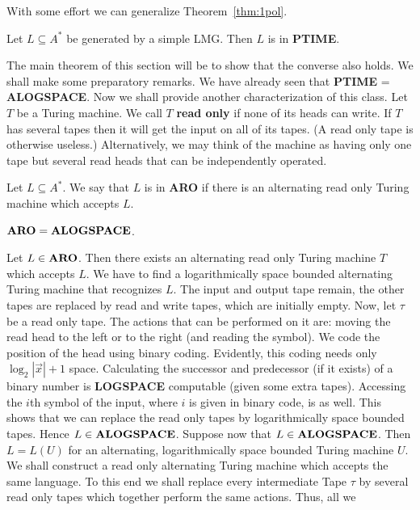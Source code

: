 With some effort we can generalize Theorem~\ref{thm:1pol}.
\begin{thm}
\label{thm:npol}
Let $L \subseteq A^{\ast}$ be generated by a simple LMG.
Then $L$ is in \textbf{PTIME}.
\end{thm}
The main theorem of this section will be to show that the
converse also holds. We shall make some preparatory remarks.
We have already seen that {\bf PTIME} = {\bf ALOGSPACE}. Now 
we shall provide another characterization of this class. Let $T$ 
be a Turing machine. We call $T$ {\bf read only} if none of 
its heads can write. If 
$T$ has several tapes then it will get the input on all of its 
tapes. (A read only tape is otherwise useless.) Alternatively, 
we may think of the machine as having only one tape but several read
heads that can be independently operated.
\begin{defn}
Let $L \subseteq A^{\ast}$. We say that $L$ is in \textbf{ARO}
if there is an alternating read only Turing machine
which accepts $L$.
\end{defn}
\begin{thm}
$\mbox{\textbf{ARO}} = \mbox{\textbf{ALOGSPACE}}$.
\end{thm}
\proofbeg
Let $L \in \mbox{\bf ARO}$. Then there exists an alternating read
only Turing machine $T$ which accepts $L$. We have to find a
logarithmically space bounded alternating Turing machine that
recognizes $L$. The input and output tape remain, the other
tapes are replaced by read and write tapes, which are initially
empty. Now, let $\tau$ be a read only tape. The actions that
can be performed on it are: moving the read head to the left
or to the right (and reading the symbol). We code the position
of the head using binary coding. Evidently, this coding needs only
$\log_2 |\vec{x}| + 1$ space. Calculating the successor and
predecessor (if it exists) of a binary number is {\bf LOGSPACE}
computable (given some extra tapes). Accessing the $i$th symbol
of the input, where $i$ is given in binary code, is as well.
This shows that we can replace the read only tapes by 
logarithmically space bounded tapes. Hence $L \in 
\mbox{\bf ALOGSPACE}$. Suppose now that $L \in \mbox{\bf ALOGSPACE}$. 
Then $L = L(U)$ for an alternating, logarithmically space bounded 
Turing machine $U$. We shall construct a read only alternating 
Turing machine which accepts the same language. To this end we 
shall replace every intermediate Tape $\tau$ by several read 
only tapes which together perform the same actions. Thus, all we
